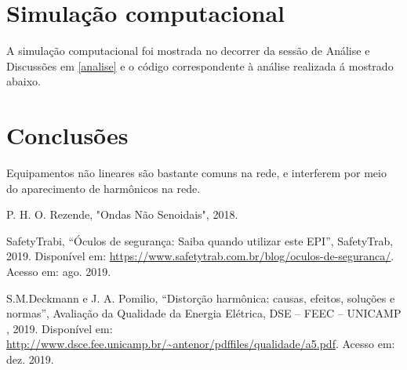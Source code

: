 \documentclass[a4paper,12pt,oneside,openany,table,xcdraw]{article}
\begin{document}
\vspace{0.4cm}
\section{Simulação computacional} %
A simulação computacional foi mostrada no decorrer da sessão de Análise e Discussões em \ref{analise} e o código correspondente à análise realizada á mostrado abaixo.
\vspace{0.3cm}


\vspace{2cm}

\newpage
\section{Conclusões} %
Equipamentos não lineares são bastante comuns na rede, e interferem por meio do aparecimento de harmônicos na rede.

\newpage
\begin{thebibliography}{9} 
    P. H. O. Rezende,
    "Ondas Não Senoidais", 2018.

    SafetyTrabi,
    “Óculos de segurança: Saiba quando utilizar este EPI”, SafetyTrab, 2019.
 Disponível em:
 \url{https://www.safetytrab.com.br/blog/oculos-de-seguranca/}. Acesso em: ago. 2019.

    S.M.Deckmann e J. A. Pomilio,
    “Distorção harmônica: causas, efeitos, soluções e normas”, Avaliação da Qualidade da Energia Elétrica, DSE – FEEC – UNICAMP , 2019.
 Disponível em:
 \url{http://www.dsce.fee.unicamp.br/~antenor/pdffiles/qualidade/a5.pdf}. Acesso em: dez. 2019.

\end{thebibliography}
\end{document}
